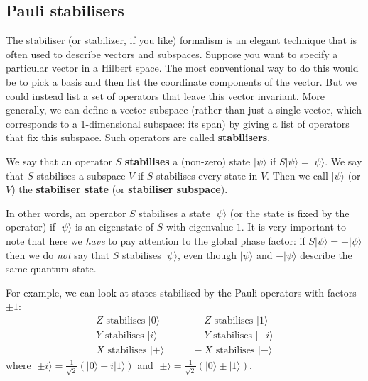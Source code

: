 \documentclass[fleqn]{article}
\newenvironment{idea}{\noindent}{\medskip}
\begin{document}
\hypertarget{pauli-stabilisers}{%
\subsection{Pauli stabilisers}\label{pauli-stabilisers}}

The stabiliser (or stabilizer, if you like) formalism is an elegant technique that is often used to describe vectors and subspaces.
Suppose you want to specify a particular vector in a Hilbert space.
The most conventional way to do this would be to pick a basis and then list the coordinate components of the vector.
But we could instead list a set of operators that leave this vector invariant.
More generally, we can define a vector subspace (rather than just a single vector, which corresponds to a 1-dimensional subspace: its span) by giving a list of operators that fix this subspace.
Such operators are called \textbf{stabilisers}.

\begin{idea}
We say that an operator \(S\) \textbf{stabilises} a (non-zero) state \(|\psi\rangle\) if \(S|\psi\rangle=|\psi\rangle\).
We say that \(S\) stabilises a subspace \(V\) if \(S\) stabilises every state in \(V\).
Then we call \(|\psi\rangle\) (or \(V\)) the \textbf{stabiliser state} (or \textbf{stabiliser subspace}).

\end{idea}

In other words, an operator \(S\) stabilises a state \(|\psi\rangle\) (or the state is fixed by the operator) if \(|\psi\rangle\) is an eigenstate of \(S\) with eigenvalue \(1\).
It is very important to note that here we \emph{have} to pay attention to the global phase factor: if \(S|\psi\rangle=-|\psi\rangle\) then we do \emph{not} say that \(S\) stabilises \(|\psi\rangle\), even though \(|\psi\rangle\) and \(-|\psi\rangle\) describe the same quantum state.

For example, we can look at states stabilised by the Pauli operators with factors \(\pm1\):
\[
  \begin{aligned}
    Z\text{ stabilises }|0\rangle
    &\qquad-Z\text{ stabilises }|1\rangle
  \\Y\text{ stabilises }|i\rangle
    &\qquad-Y\text{ stabilises }|-i\rangle
  \\X\text{ stabilises }|+\rangle
    &\qquad-X\text{ stabilises }|-\rangle
  \end{aligned}
\]
where \(|\pm i\rangle=\frac{1}{\sqrt{2}}(|0\rangle+i|1\rangle)\) and \(|\pm\rangle=\frac{1}{\sqrt{2}}(|0\rangle\pm|1\rangle)\).
\end{document}
